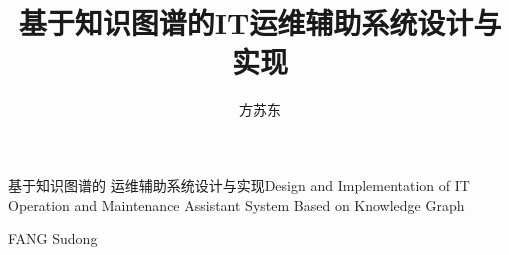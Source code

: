\title{基于知识图谱的IT运维辅助系统设计与实现}{基于知识图谱的  运维辅助系统设计与实现}{\quad}{\quad}{Design and Implementation of IT Operation and Maintenance Assistant System Based on Knowledge Graph}{}
\author{方苏东}{FANG Sudong}
\authorizedate{\quad}


\makecover
\cleardoublepage


